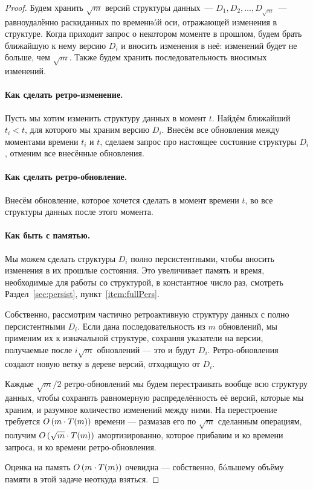 \begin{proof}
	Будем хранить $\sqrt{m}$ версий структуры данных~— $D_1, D_2, \ldots, D_{\sqrt{m}}$~— равноудалённо раскиданных по временн\'oй оси, отражающей изменения в структуре. Когда приходит запрос о некотором моменте в прошлом, будем брать ближайшую к нему версию $D_i$ и вносить изменения в неё: изменений будет не больше, чем $\sqrt{m}$. Также будем хранить последовательность вносимых изменений.

	\paragraph{Как сделать ретро-изменение.} Пусть мы хотим изменить структуру данных в момент $t$. Найдём ближайший $t_i < t$, для которого мы храним версию $D_i$. Внесём все обновления между моментами времени $t_i$ и $t$, сделаем запрос про настоящее состояние структуры $D_i$, отменим все внесённые обновления.

	\paragraph{Как сделать ретро-обновление.} Внесём обновление, которое хочется сделать в момент времени $t$, во все структуры данных после этого момента.

	\paragraph{Как быть с памятью.} Мы можем сделать структуры $D_i$ полно персистентными, чтобы вносить изменения в их прошлые состояния.  Это увеличивает память и время, необходимые для работы со структурой, в константное число раз, смотреть Раздел~\ref{sec:persist}, пункт~\ref{item:fullPers}.
	
	Собственно, рассмотрим частично ретроактивную структуру данных с полно персистентными $D_i$. Если дана последовательность из $m$ обновлений, мы применим их к изначальной структуре, сохраняя указатели на версии, получаемые после $i \sqrt{m}$ обновлений — это и будут $D_i$. Ретро-обновления создают новую ветку в дереве версий, отходящую от $D_i$.
	
	Каждые $\sqrt{m} / 2$ ретро-обновлений мы будем перестраивать вообще всю структуру данных, чтобы сохранять равномерную распределённость её версий, которые мы храним, и разумное количество изменений между ними. На перестроение требуется $O \left( m \cdot T(m) \right)$ времени — размазав его по $\sqrt{m}$ сделанным операциям, получим $O \left( \sqrt{m} \cdot T(m) \right)$ амортизированно, которое прибавим и ко времени запроса, и ко времени ретро-обновления.
	
	Оценка на память $O \left( m \cdot T(m) \right)$ очевидна — собственно, б\'oльшему объёму памяти в этой задаче неоткуда взяться.
\end{proof}

